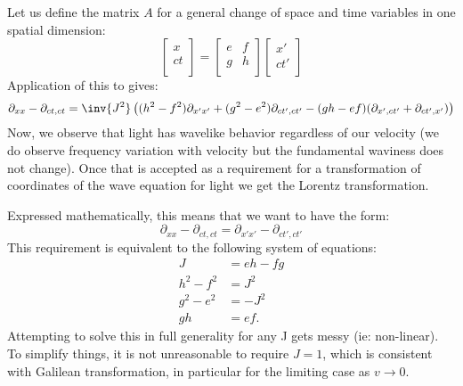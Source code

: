 Let us define the matrix \(A\) for a general change of space and time variables in one spatial dimension:
%
\begin{equation}
\begin{bmatrix}
x \\
ct \\
\end{bmatrix}
=
\begin{bmatrix}
e & f \\
g & h \\
\end{bmatrix}
\begin{bmatrix}
x' \\
c t' \\
\end{bmatrix}
\end{equation}
%
Application of this to  gives:
%
\begin{equation}\label{eqn:Lor:transformedlightwave}
\partial_{xx} -\partial_{ct,ct} =
\inv{J^2}
\left(
(h^2 - f^2)\partial_{x'x'}
+(g^2 - e^2)\partial_{ct',ct'}
-(g h - e f)( \partial_{x',ct'} + \partial_{ct',x'}  )
\right)
\end{equation}
%
Now, we observe that light has wavelike behavior regardless of our velocity (we do observe frequency variation with
velocity but the fundamental waviness does not change).  Once that is accepted as a requirement for a transformation
of coordinates of the wave equation for light we get the Lorentz transformation.

Expressed mathematically, this means that we want  to have the form:
%
\begin{equation}
\partial_{xx} -\partial_{ct,ct} = \partial_{x'x'} -\partial_{ct',ct'}
\end{equation}
%
This requirement is equivalent to the following system of equations:
%
\begin{equation}\label{eqn:lorentz:320}
\begin{aligned}
J &= eh - fg \\
h^2 - f^2 &= J^2 \\
g^2 - e^2 &= -J^2 \\
g h &= e f.
\end{aligned}
\end{equation}
%
Attempting to solve this in full generality for any J gets messy (ie: non-linear).
To simplify things, it is not unreasonable to
require \(J = 1\), which is consistent with Galilean transformation, in particular for the limiting case as \(v \rightarrow 0\).

